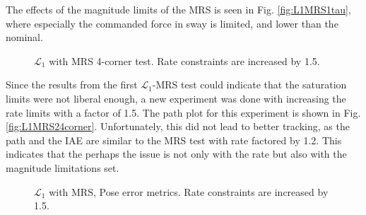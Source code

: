 The effects of the magnitude limits of the MRS is seen in Fig. \ref{fig:L1MRS1tau}, where especially the commanded force in sway is limited, and lower than the nominal.

\begin{figure}[!h]
    \centering
    \caption{ $\mathcal{L}_1$ with MRS 4-corner test. Rate constraints are increased by 1.5. }
\end{figure}\label{fig:L1MRS24corner}

Since the results from the first $\mathcal{L}_1$-MRS test could indicate that the saturation limits were not liberal enough, a new experiment was done with increasing the rate limits with a factor of 1.5. The path plot for this experiment is shown in Fig. \ref{fig:L1MRS24corner}. Unfortunately, this did not lead to better tracking, as the path and the IAE are similar to the MRS test with rate factored by 1.2. This indicates that the perhaps the issue is not only with the rate but also with the magnitude limitations set. 

\begin{figure}[!h]
    \centering
    \caption{ $\mathcal{L}_1$ with MRS, Pose error metrics. Rate constraints are increased by 1.5. }
\end{figure}\label{fig:L1MRS2Metrics}


